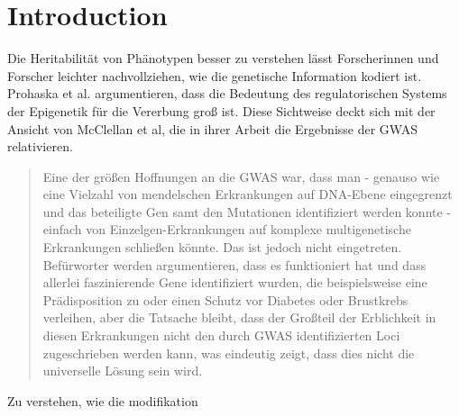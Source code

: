 \documentclass{SeminarV2}
\begin{document}
\section{Introduction}
Die Heritabilit{\"a}t von Ph{\"a}notypen besser zu verstehen l{\"a}sst Forscherinnen und Forscher leichter
nachvollziehen, wie die genetische Information kodiert ist.
Prohaska et al. argumentieren, dass die Bedeutung des regulatorischen Systems der Epigenetik für die Vererbung gro{\ss} ist.
\cite{prohaska-2010}
Diese Sichtweise deckt sich mit der Ansicht von McClellan et al,
die in ihrer Arbeit die Ergebnisse der GWAS relativieren.
\begin{quote}
  \sloppy
  Eine der gr{\"o}{\ss}en Hoffnungen an die GWAS war, dass man - genauso wie eine Vielzahl von mendelschen Erkrankungen auf DNA-Ebene eingegrenzt und das beteiligte Gen samt den Mutationen identifiziert werden konnte - einfach von Einzelgen-Erkrankungen auf komplexe multigenetische Erkrankungen schlie{\ss}en k{\"o}nnte. Das ist jedoch nicht eingetreten. Befürworter werden argumentieren, dass es funktioniert hat und dass allerlei faszinierende Gene identifiziert wurden, die beispielsweise eine Prädisposition zu oder einen Schutz vor Diabetes oder Brustkrebs verleihen, aber die Tatsache bleibt, dass der Gro{\ss}teil der Erblichkeit in diesen Erkrankungen nicht den durch GWAS identifizierten Loci zugeschrieben werden kann, was eindeutig zeigt, dass dies nicht die universelle L{\"o}sung sein wird.
\end{quote}
\cite{mcclellan-2010}
Zu verstehen, wie die modifikation


\begin{footnotesize}


\newpage




\end{footnotesize}

\end{document}
